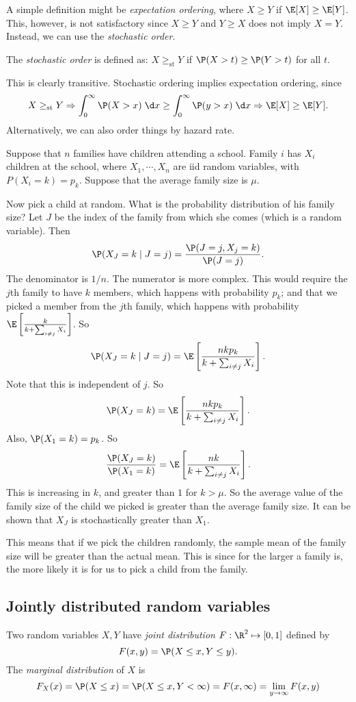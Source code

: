 \documentclass[a4paper]{article}
\begin{document}
A simple definition might be \emph{expectation ordering}, where $X \geq Y$ if $\E[X] \geq \E[Y]$. This, however, is not satisfactory since $X \geq Y$ and $Y \geq X$ does not imply $X = Y$. Instead, we can use the \emph{stochastic order}.
\begin{defi}
  The \emph{stochastic order} is defined as: $X \geq_{\mathrm{st}} Y$ if $\P(X > t) \geq \P(Y > t)$ for all $t$.
\end{defi}
This is clearly transitive. Stochastic ordering implies expectation ordering, since
\[
  X \geq_{\mathrm{st}} Y \Rightarrow \int_0^\infty \P(X > x)\;\d x \geq \int_0^\infty \P(y > x)\;\d x \Rightarrow \E[X] \geq \E[Y].
\]
Alternatively, we can also order things by hazard rate.
\begin{eg}
  Suppose that $n$ families have children attending a school. Family $i$ has $X_i$ children at the school, where $X_1, \cdots, X_n$ are iid random variables, with $P(X_i = k) = p_k$. Suppose that the average family size is $\mu$.

  Now pick a child at random. What is the probability distribution of his family size? Let $J$ be the index of the family from which she comes (which is a random variable). Then
  \[
    \P(X_J = k\mid J = j) = \frac{\P(J = j, X_j = k)}{\P(J = j)}.
  \]
  The denominator is $1/n$. The numerator is more complex. This would require the $j$th family to have $k$ members, which happens with probability $p_k$; and that we picked a member from the $j$th family, which happens with probability $\E\left[\frac{k}{k + \sum_{i \not=j} X_i}\right]$. So
  \[
    \P(X_J = k \mid J = j) = \E\left[\frac{nkp_k}{k + \sum_{i \not=j} X_i}\right].
  \]
  Note that this is independent of $j$. So
  \[
    \P(X_J = k) = \E\left[\frac{nkp_k}{k + \sum_{i \not=j} X_i}\right].
  \]
  Also, $\P(X_1 = k) = p_k$. So
  \[
    \frac{\P(X_J = k)}{\P(X_1 = k)} = \E\left[\frac{nk}{k + \sum_{i \not= j}X_i}\right].
  \]
  This is increasing in $k$, and greater than $1$ for $k > \mu$. So the average value of the family size of the child we picked is greater than the average family size. It can be shown that $X_J$ is stochastically greater than $X_1$.

  This means that if we pick the children randomly, the sample mean of the family size will be greater than the actual mean. This is since for the larger a family is, the more likely it is for us to pick a child from the family.
\end{eg}

\subsection{Jointly distributed random variables}
\begin{defi}
  Two random variables $X, Y$ have \emph{joint distribution} $F: \R^2 \mapsto [0, 1]$ defined by
  \[
    F(x, y) = \P(X \leq x, Y \leq y).
  \]
  The \emph{marginal distribution} of $X$ is
  \[
    F_X(x) = \P(X \leq x) = \P(X \leq x, Y < \infty) = F(x, \infty) = \lim_{y \to \infty}F(x, y)
  \]
\end{defi}
\end{document}
